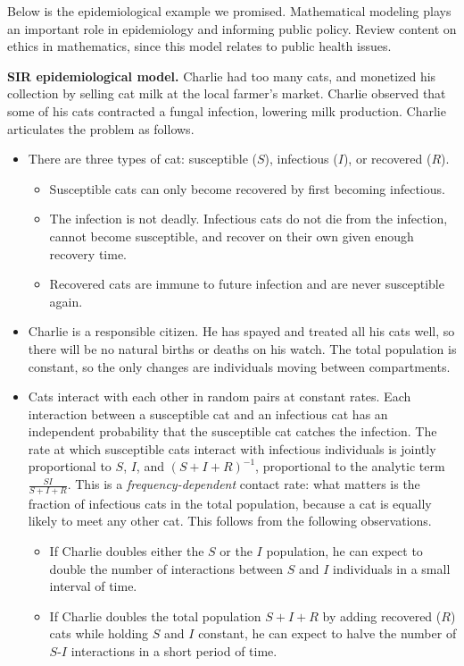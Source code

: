Below is the epidemiological example we promised.
Mathematical modeling plays an important role in epidemiology and informing public policy.
Review content on ethics in mathematics, since this model relates to public health issues.
\begin{example}\label{ex:sir_first}
\textbf{SIR epidemiological model.}
Charlie had too many cats, and monetized his collection by selling cat milk at the local farmer's market.
Charlie observed that some of his cats contracted a fungal infection, lowering milk production.
Charlie articulates the problem as follows.
\begin{itemize}
\item There are three types of cat: susceptible ($S$), infectious ($I$), or recovered ($R$).
\begin{itemize}
\item Susceptible cats can only become recovered by first becoming infectious.
\item The infection is not deadly. Infectious cats do not die from the infection, cannot become susceptible, and recover on their own given enough recovery time.
\item Recovered cats are immune to future infection and are never susceptible again.
\end{itemize}
\item Charlie is a responsible citizen. He has spayed and treated all his cats well, so there will be no natural births or deaths on his watch. The total population is constant, so the only changes are individuals moving between compartments.
\item Cats interact with each other in random pairs at constant rates. Each interaction between a susceptible cat and an infectious cat has an independent probability that the susceptible cat catches the infection. The rate at which susceptible cats interact with infectious individuals is jointly proportional to $S$, $I$, and $(S+I+R)^{-1}$, proportional to the analytic term $\frac{SI}{S+I+R}$. This is a \emph{frequency-dependent} contact rate: what matters is the fraction of infectious cats in the total population, because a cat is equally likely to meet any other cat. This follows from the following observations.
\begin{itemize}
\item If Charlie doubles either the $S$ or the $I$ population, he can expect to double the number of interactions between $S$ and $I$ individuals in a small interval of time.
\item If Charlie doubles the total population $S+I+R$ by adding recovered ($R$) cats while holding $S$ and $I$ constant, he can expect to halve the number of $S$-$I$ interactions in a short period of time.
\end{itemize}
\end{itemize}


\end{example}
